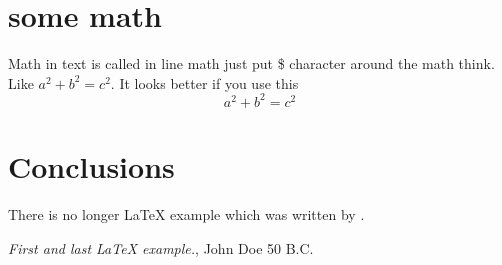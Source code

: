 \documentclass[12pt, a4paper, twoside]{article}
\begin{document}
\section{some math}

Math in text is called in line math just put \$ character around 
the math think. Like $ a^2 + b^2 = c^2 $. It looks better if you use 
this 
\[a^2 + b^2 = c^2\]

\section{Conclusions}\label{conclusions}
There is no longer \LaTeX{} example which was written by \cite{doe}.

\begin{thebibliography}{9}
 \emph{First and last \LaTeX{} example.},
John Doe 50 B.C. 
\end{thebibliography}
\end{document}
